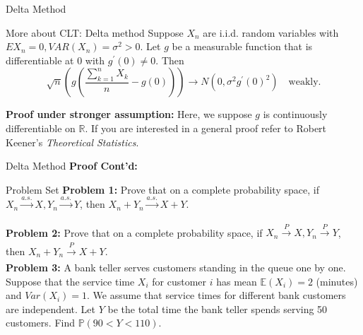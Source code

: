 \documentclass [aspectratio=169]{beamer}
\begin{document}
\begin{frame}{Delta Method}
    \begin{block}{More about CLT: Delta method}
    Suppose $X_n$ are i.i.d. random variables with $EX_n=0, VAR(X_n) = \sigma^2 >0$. Let $g$ be a measurable function that is differentiable at $0$ with $g^\prime(0) \neq 0$. Then
    \[
    \sqrt{n}\left(g\left(\frac{\sum_{k=1}^nX_k}{n} - g(0) \right)\right) \to N(0, \sigma^2g^\prime(0)^2) \quad \text{weakly.}
    \] 
    \end{block}
    \textbf{Proof under stronger assumption: } Here, we suppose $g$ is continuously differentiable on $\mathbb{R}$. If you are interested in a general proof refer to Robert Keener's \textit{Theoretical Statistics}.
    \vspace{1.8in}
\end{frame}

\begin{frame}{Delta Method}
\textbf{Proof Cont'd:}
\vspace{6cm}

\end{frame}


\begin{frame}{Problem Set}
    \textbf{Problem 1:}  Prove that on a complete probability space, if $X_n  \xrightarrow[]{a.s.} X, Y_n  \xrightarrow[]{a.s.} Y$, then $X_n + Y_n \xrightarrow[]{a.s.} X+Y$.\\
    \vspace{0.1in}
    
     \textbf{Problem 2:} Prove that on a complete probability space, if $X_n  \xrightarrow[]{P} X, Y_n  \xrightarrow[]{P} Y$, then $X_n + Y_n \xrightarrow[]{P} X+Y$.
    \vspace{0.1in}\\
    
    \textbf{Problem 3:} A bank teller serves customers standing in the queue one by one. Suppose that the service time $X_i$ for customer $i$ has mean $\mathbb{E}(X_i) = 2$ (minutes) and $Var(X_i) = 1$. We assume that service times for different bank customers are independent. Let $Y$ be the total time the bank teller spends serving 50 customers. Find $\mathbb{P}(90<Y<110)$.
    \vspace{0.1in}\\
   
\end{frame}
\end{document}
